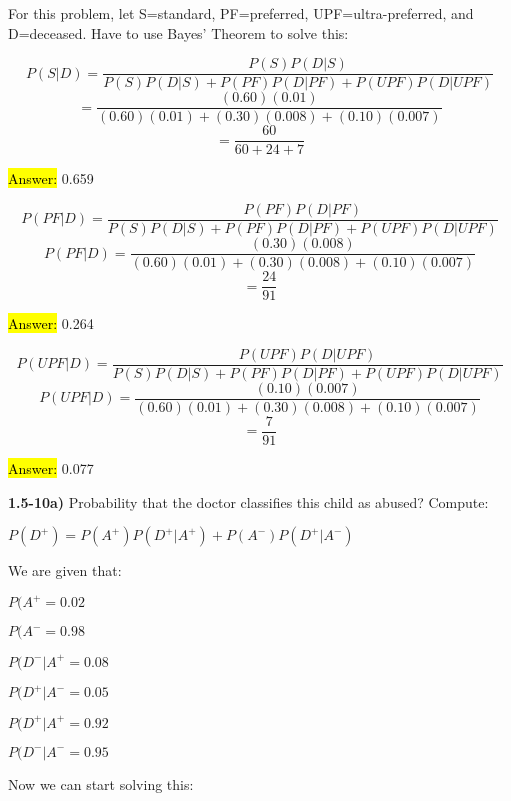 \documentclass{article}
\begin{document}
For this problem, let S=standard, PF=preferred, UPF=ultra-preferred, and D=deceased. Have to use Bayes' Theorem to solve this:
\vspace{3mm}

$$P(S | D) = \frac{P(S)P(D | S)}{P(S)P(D | S) + P(PF)P(D | PF) + P(UPF)P(D | UPF)}$$
$$=\frac{(0.60)(0.01)}{(0.60)(0.01) + (0.30)(0.008) + (0.10)(0.007)}$$
$$=\frac{60}{60 + 24 + 7}$$
\vspace{3mm}

\hl{Answer:} 0.659
\vspace{3mm}


$$P(PF | D)= \frac{P(PF)P(D | PF)}{P(S)P(D | S) + P(PF)P(D | PF) + P(UPF)P(D | UPF)}$$
$$P(PF| D) = \frac{(0.30)(0.008)}{(0.60)(0.01) + (0.30)(0.008) + (0.10)(0.007)}$$
$$= \frac{24}{91}$$
\vspace{3mm}

\hl{Answer:} 0.264
\vspace{3mm}

$$P(UPF | D) =\frac{P(UPF)P(D | UPF)}{P(S)P(D | S) + P(PF)P(D | PF) + P(UPF)P(D | UPF)}$$
$$P(UPF | D) = \frac{(0.10)(0.007)}{(0.60)(0.01) + (0.30)(0.008) + (0.10)(0.007) }$$
$$= \frac{7}{91}$$


\hl{Answer:}  0.077




\newpage

\textbf{1.5-10a)}  Probability that the doctor classifies this child as abused? Compute: 

\vspace{2mm}

$P(D^{+})=P(A^{+}) P(D^{+} | A^{+}) +P(A^{-}) P(D^{+} | A^{-})$ 

\vspace{2mm}

We are given that:

\vspace{2mm}

$P(A^{+}=0.02$

$P(A^{-}=0.98$

$P(D^{-} | A^{+}=0.08$

$P(D^{+} | A^{-}=0.05$


$P(D^{+} | A^{+}=0.92$


$P(D^{-} | A^{-}=0.95$


\vspace{2mm}
Now we can start solving this: 

\vspace{2mm}
\end{document}
